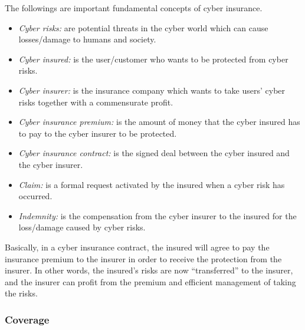 \documentclass[twocolumn,10pt]{IEEEtran}
\begin{document}
The followings are important fundamental concepts of cyber insurance.
\begin{itemize}
	\item \emph{Cyber risks:} are potential threats in the cyber world which can cause losses/damage to humans and society.
	\item \emph{Cyber insured:} is the user/customer who wants to be protected from cyber risks. 
	\item \emph{Cyber insurer:} is the insurance company which wants to take users' cyber risks together with a commensurate profit.
	\item \emph{Cyber insurance premium:} is the amount of money that the cyber insured has to pay to the cyber insurer to be protected.
	\item \emph{Cyber insurance contract:} is the signed deal between the cyber insured and the cyber insurer. 
	\item \emph{Claim:} is a formal request activated by the insured when a cyber risk has occurred. 
	\item \emph{Indemnity:} is the compensation from the cyber insurer to the insured for the loss/damage caused by cyber risks.
\end{itemize}

Basically, in a cyber insurance contract, the insured will agree to pay the insurance premium to the insurer in order to receive the protection from the insurer. In other words, the insured's risks are now ``transferred'' to the insurer, and the insurer can profit from the premium and efficient management of taking the risks. 

\subsubsection{Coverage}
\end{document}

